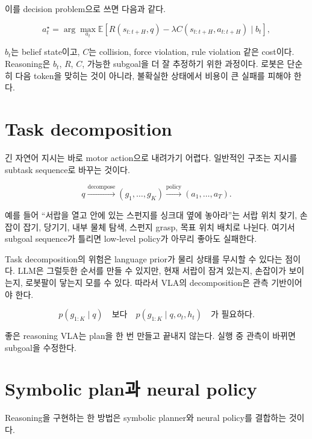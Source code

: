 이를 decision problem으로 쓰면 다음과 같다.

\begin{equation}
  a_t^\star
  =
  \arg\max_{a_t}
  \mathbb{E}
  \left[
    R(s_{t:t+H},q)
    -
    \lambda C(s_{t:t+H},a_{t:t+H})
    \mid
    b_t
  \right],
\end{equation}

$b_t$는 belief state이고, $C$는 collision, force violation, rule violation 같은 cost이다. Reasoning은 $b_t$, $R$, $C$, 가능한 subgoal을 더 잘 추정하기 위한 과정이다. 로봇은 단순히 다음 token을 맞히는 것이 아니라, 불확실한 상태에서 비용이 큰 실패를 피해야 한다.

\section{Task decomposition}

긴 자연어 지시는 바로 motor action으로 내려가기 어렵다. 일반적인 구조는 지시를 subtask sequence로 바꾸는 것이다.

\begin{equation}
  q
  \xrightarrow{\mathrm{decompose}}
  (g_1,\ldots,g_K)
  \xrightarrow{\mathrm{policy}}
  (a_1,\ldots,a_T).
\end{equation}

예를 들어 ``서랍을 열고 안에 있는 스펀지를 싱크대 옆에 놓아라''는 서랍 위치 찾기, 손잡이 잡기, 당기기, 내부 물체 탐색, 스펀지 grasp, 목표 위치 배치로 나뉜다. 여기서 subgoal sequence가 틀리면 low-level policy가 아무리 좋아도 실패한다.

Task decomposition의 위험은 language prior가 물리 상태를 무시할 수 있다는 점이다. LLM은 그럴듯한 순서를 만들 수 있지만, 현재 서랍이 잠겨 있는지, 손잡이가 보이는지, 로봇팔이 닿는지 모를 수 있다. 따라서 VLA의 decomposition은 관측 기반이어야 한다.

\begin{equation}
  p(g_{1:K} \mid q)
  \quad \text{보다} \quad
  p(g_{1:K} \mid q,o_t,h_t)
  \quad \text{가 필요하다.}
\end{equation}

좋은 reasoning VLA는 plan을 한 번 만들고 끝내지 않는다. 실행 중 관측이 바뀌면 subgoal을 수정한다.

\section{Symbolic plan과 neural policy}

Reasoning을 구현하는 한 방법은 symbolic planner와 neural policy를 결합하는 것이다.

